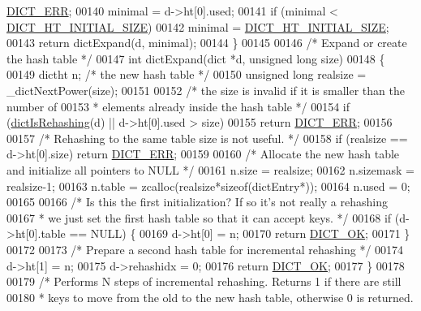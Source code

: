\begin{DoxyCode}
      \hyperlink{dict_8h_a6ce31f31f044b1570d335e8fa0c388c6}{DICT\_ERR};
00140     minimal = d->ht[0].used;
00141     \textcolor{keywordflow}{if} (minimal < \hyperlink{dict_8h_aff97c19d1616cf2c697573ee3f515692}{DICT\_HT\_INITIAL\_SIZE})
00142         minimal = \hyperlink{dict_8h_aff97c19d1616cf2c697573ee3f515692}{DICT\_HT\_INITIAL\_SIZE};
00143     \textcolor{keywordflow}{return} dictExpand(d, minimal);
00144 \}
00145 
00146 \textcolor{comment}{/* Expand or create the hash table */}
00147 \textcolor{keywordtype}{int} dictExpand(dict *d, \textcolor{keywordtype}{unsigned} \textcolor{keywordtype}{long} size)
00148 \{
00149     dictht n; \textcolor{comment}{/* the new hash table */}
00150     \textcolor{keywordtype}{unsigned} \textcolor{keywordtype}{long} realsize = \_dictNextPower(size);
00151 
00152     \textcolor{comment}{/* the size is invalid if it is smaller than the number of}
00153 \textcolor{comment}{     * elements already inside the hash table */}
00154     \textcolor{keywordflow}{if} (\hyperlink{dict_8h_aa6e4917a6a32fdf47180e03ed8969e02}{dictIsRehashing}(d) || d->ht[0].used > size)
00155         \textcolor{keywordflow}{return} \hyperlink{dict_8h_a6ce31f31f044b1570d335e8fa0c388c6}{DICT\_ERR};
00156 
00157     \textcolor{comment}{/* Rehashing to the same table size is not useful. */}
00158     \textcolor{keywordflow}{if} (realsize == d->ht[0].size) \textcolor{keywordflow}{return} \hyperlink{dict_8h_a6ce31f31f044b1570d335e8fa0c388c6}{DICT\_ERR};
00159 
00160     \textcolor{comment}{/* Allocate the new hash table and initialize all pointers to NULL */}
00161     n.size = realsize;
00162     n.sizemask = realsize-1;
00163     n.table = zcalloc(realsize*\textcolor{keyword}{sizeof}(dictEntry*));
00164     n.used = 0;
00165 
00166     \textcolor{comment}{/* Is this the first initialization? If so it's not really a rehashing}
00167 \textcolor{comment}{     * we just set the first hash table so that it can accept keys. */}
00168     \textcolor{keywordflow}{if} (d->ht[0].table == NULL) \{
00169         d->ht[0] = n;
00170         \textcolor{keywordflow}{return} \hyperlink{dict_8h_a2afecbeab8f7efbc183048f52f6d17e5}{DICT\_OK};
00171     \}
00172 
00173     \textcolor{comment}{/* Prepare a second hash table for incremental rehashing */}
00174     d->ht[1] = n;
00175     d->rehashidx = 0;
00176     \textcolor{keywordflow}{return} \hyperlink{dict_8h_a2afecbeab8f7efbc183048f52f6d17e5}{DICT\_OK};
00177 \}
00178 
00179 \textcolor{comment}{/* Performs N steps of incremental rehashing. Returns 1 if there are still}
00180 \textcolor{comment}{ * keys to move from the old to the new hash table, otherwise 0 is returned.}

\end{DoxyCode}
